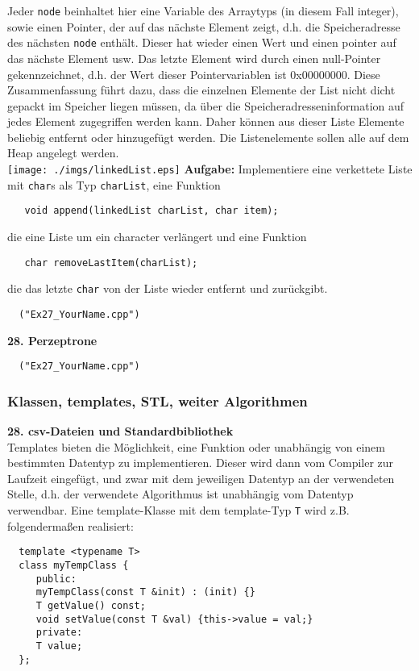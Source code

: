 \documentclass[paper=A4, pagesize, DIV=calc, smallheadings,
fontsize=11pt, expansion=false]{scrreprt}
\begin{document}
Jeder \texttt{node} beinhaltet hier eine Variable des Arraytyps (in diesem Fall integer), sowie einen Pointer, der auf das nächste Element zeigt, d.h. die Speicheradresse des nächsten \texttt{node} enthält. Dieser hat wieder einen Wert und einen pointer auf das nächste Element usw. 
Das letzte Element wird durch einen null-Pointer gekennzeichnet, d.h. der Wert dieser Pointervariablen ist 0x00000000.
Diese Zusammenfassung führt dazu, dass die einzelnen Elemente der List nicht dicht gepackt im Speicher liegen müssen, da über die Speicheradresseninformation auf jedes Element zugegriffen werden kann. Daher können aus dieser Liste Elemente beliebig entfernt oder hinzugefügt werden. Die Listenelemente sollen alle auf dem Heap angelegt werden.
\vspace{2ex}
\\
\texttt{[image: ./imgs/linkedList.eps]}
\vspace{2ex}
\textbf{Aufgabe:} Implementiere eine verkettete Liste mit \texttt{char}s als Typ \texttt{charList}, eine Funktion
\begin{verbatim}
   void append(linkedList charList, char item);
\end{verbatim}
die eine Liste um ein character verlängert und eine Funktion
\begin{verbatim}
   char removeLastItem(charList);
\end{verbatim}
die das letzte \texttt{char} von der Liste wieder entfernt und zurückgibt.
\begin{verbatim}
  ("Ex27_YourName.cpp")
\end{verbatim}

\textbf{28. Perzeptrone}
\begin{verbatim}
  ("Ex27_YourName.cpp")
\end{verbatim}

\subsubsection{Klassen, templates, STL, weiter Algorithmen}

\textbf{28. csv-Dateien und Standardbibliothek}\\
  Templates bieten die Möglichkeit, eine Funktion oder unabhängig von einem bestimmten Datentyp zu implementieren. 
  Dieser wird dann vom Compiler zur Laufzeit eingefügt, und zwar mit dem jeweiligen Datentyp an der verwendeten Stelle, d.h. der verwendete Algorithmus ist unabhängig vom Datentyp verwendbar.
  Eine template-Klasse mit dem template-Typ \texttt{T} wird z.B. folgendermaßen realisiert:
  \begin{verbatim}
  template <typename T>
  class myTempClass {
     public:
     myTempClass(const T &init) : (init) {}      
     T getValue() const;
     void setValue(const T &val) {this->value = val;}
     private:
     T value;
  };
  \end{verbatim}
\end{document}
